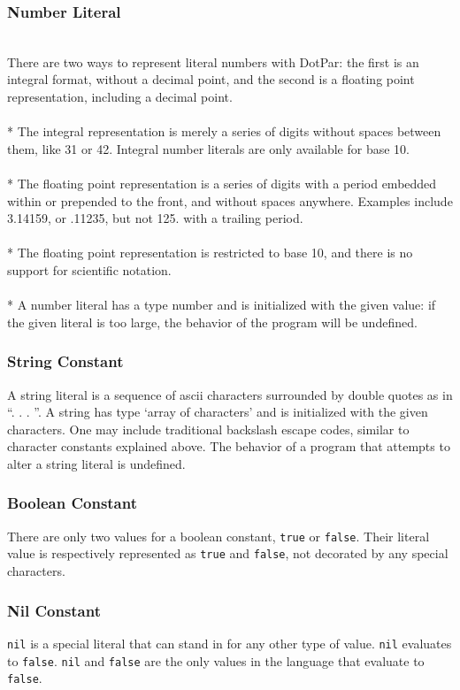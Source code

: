 \documentclass[11pt]{article}
\begin{document}
\subsubsection{Number Literal}
\\There are two ways to represent literal numbers with DotPar: the first is an integral format, without a decimal point, and the second is a floating point representation, including a decimal point.
\\ \\* The integral representation is merely a series of digits without spaces between them, like 31 or 42. Integral number literals are only available for base 10.
\\ \\* The floating point representation is a series of digits with a period embedded within or prepended to the front, and without spaces anywhere. Examples include 3.14159, or .11235, but not 125. with a trailing period.
\\ \\* The floating point representation is restricted to base 10, and there is no support for scientific notation.
\\ \\* A number literal has a type number and is initialized with the given value: if the given literal is too large, the behavior of the program will be undefined.
\subsubsection{String Constant}
A string literal is a sequence of ascii characters surrounded by double quotes as in ``. . . ''. A string has type `array of characters' and is initialized with the given characters. One may include traditional backslash escape codes, similar to character constants explained above. The behavior of a program that attempts to alter a string literal is undefined.
\subsubsection{Boolean Constant}
There are only two values for a boolean constant, \verb!true! or \verb!false!. Their literal value is respectively represented as \verb!true! and \verb!false!, not decorated by any special characters.
\subsubsection{Nil Constant}
\verb!nil! is a special literal that can stand in for any other type of value. \verb!nil! evaluates to \verb!false!. \verb!nil! and \verb!false! are the only values in the language that evaluate to \verb!false!.
\end{document}
